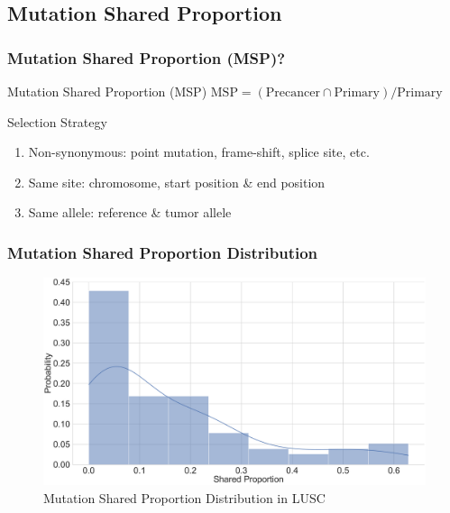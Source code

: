 \documentclass{beamer}
\begin{document}
    \subsection{Mutation Shared Proportion}
    \begin{frame}
        \frametitle{Mutation Shared Proportion (MSP)?}

        \begin{block}{Mutation Shared Proportion (MSP)}
            $\textrm{MSP} = (\textrm{Precancer} \cap \textrm{Primary}) / \textrm{Primary}$
        \end{block}

        \begin{block}{Selection Strategy}
            \begin{enumerate}
                \item Non-synonymous: point mutation, frame-shift, splice site, etc.
                \item Same site: chromosome, start position \& end position
                \item Same allele: reference \& tumor allele
            \end{enumerate}
        \end{block}
    \end{frame}

    \begin{frame}
        \frametitle{Mutation Shared Proportion Distribution}

        \begin{figure}
            \includegraphics[width=0.8 \linewidth]{figures/Mutation_Shared_Proportion/Histogram/BWA.SQC.SharedProportion.pdf}
            \caption{Mutation Shared Proportion Distribution in LUSC}
        \end{figure}
    \end{frame}
\end{document}
